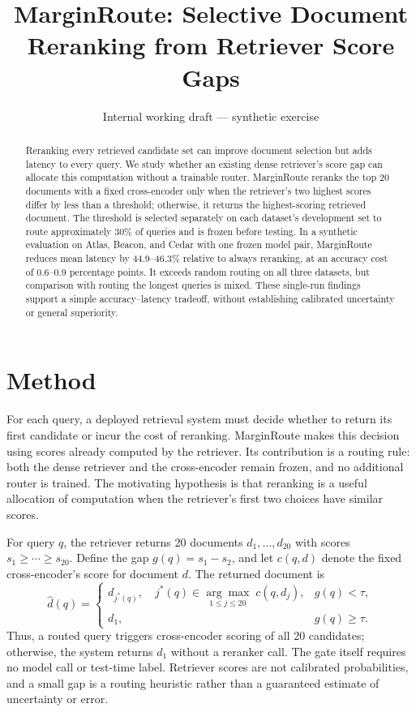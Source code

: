 \documentclass[11pt]{article}
\title{MarginRoute: Selective Document Reranking from Retriever Score Gaps}
\author{}
\date{Internal working draft --- synthetic exercise}
\begin{document}
\maketitle

\begin{abstract}
Reranking every retrieved candidate set can improve document selection but adds latency to every query. We study whether an existing dense retriever's score gap can allocate this computation without a trainable router. MarginRoute reranks the top 20 documents with a fixed cross-encoder only when the retriever's two highest scores differ by less than a threshold; otherwise, it returns the highest-scoring retrieved document. The threshold is selected separately on each dataset's development set to route approximately 30\% of queries and is frozen before testing. In a synthetic evaluation on Atlas, Beacon, and Cedar with one frozen model pair, MarginRoute reduces mean latency by 44.9--46.3\% relative to always reranking, at an accuracy cost of 0.6--0.9 percentage points. It exceeds random routing on all three datasets, but comparison with routing the longest queries is mixed. These single-run findings support a simple accuracy--latency tradeoff, without establishing calibrated uncertainty or general superiority.
\end{abstract}

\section{Method}
\label{sec:method}
For each query, a deployed retrieval system must decide whether to return its first candidate or incur the cost of reranking. MarginRoute makes this decision using scores already computed by the retriever. Its contribution is a routing rule: both the dense retriever and the cross-encoder remain frozen, and no additional router is trained. The motivating hypothesis is that reranking is a useful allocation of computation when the retriever's first two choices have similar scores.

For query $q$, the retriever returns 20 documents $d_1,\ldots,d_{20}$ with scores $s_1\geq\cdots\geq s_{20}$. Define the gap $g(q)=s_1-s_2$, and let $c(q,d)$ denote the fixed cross-encoder's score for document $d$. The returned document is
\begin{equation}
\widehat d(q)=
\begin{cases}
 d_{j^*(q)},\quad j^*(q)\in\underset{1\leq j\leq 20}{\arg\max}\;c(q,d_j),
    & g(q)<\tau,\\[3pt]
 d_1, & g(q)\geq\tau.
\end{cases}
\label{eq:route}
\end{equation}
Thus, a routed query triggers cross-encoder scoring of all 20 candidates; otherwise, the system returns $d_1$ without a reranker call. The gate itself requires no model call or test-time label. Retriever scores are not calibrated probabilities, and a small gap is a routing heuristic rather than a guaranteed estimate of uncertainty or error.
\end{document}
